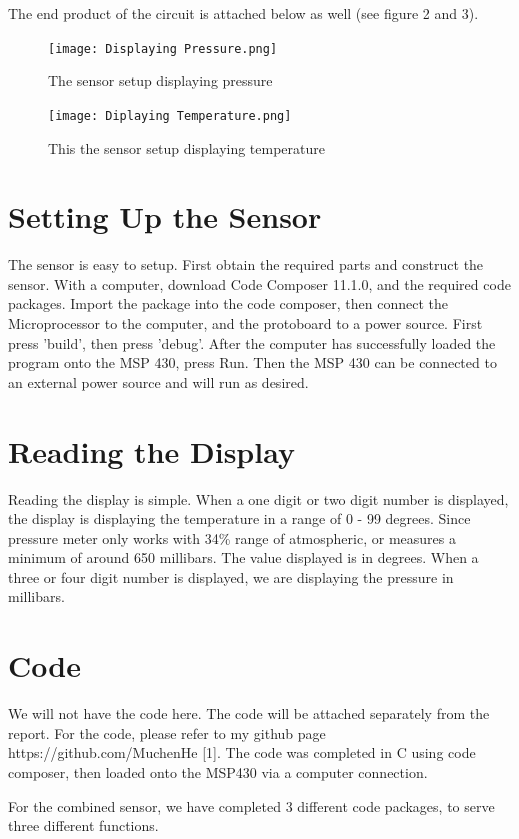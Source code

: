 \documentclass{article}
\begin{document}
The end product of the circuit is attached below as well (see figure 2 and 3). 

\begin{figure}[h]
    \centering
    \texttt{[image: Displaying Pressure.png]}
    \caption{The sensor setup displaying pressure}
\end{figure} 

\begin{figure}[h]
    \centering
    \texttt{[image: Diplaying Temperature.png]}
    \caption{This the sensor setup displaying temperature}
\end{figure} 

\section{Setting Up the Sensor}
The sensor is easy to setup. First obtain the required parts and construct the sensor. With a computer, download Code Composer 11.1.0, and the required code packages. Import the package into the code composer, then connect the Microprocessor to the computer, and the protoboard to a power source. First press 'build', then press 'debug'. After the computer has successfully loaded the program onto the MSP 430, press Run. Then the MSP 430 can be connected to an external power source and will run as desired. 

\section{Reading the Display}
Reading the display is simple. When a one digit or two digit number is displayed, the display is displaying the temperature in a range of 0 - 99 degrees. Since pressure meter only works with 34\% range of atmospheric, or measures a minimum of around 650 millibars. The value displayed is in degrees. When a three or four digit number is displayed, we are displaying the pressure in millibars. 

\section{Code} 
We will not have the code here. The code will be attached separately from the report. For the code, please refer to my github page https://github.com/MuchenHe [1]. The code was completed in C using code composer, then loaded onto the MSP430 via a computer connection. 

For the combined sensor, we have completed 3 different code packages, to serve three different functions. 
\end{document}
